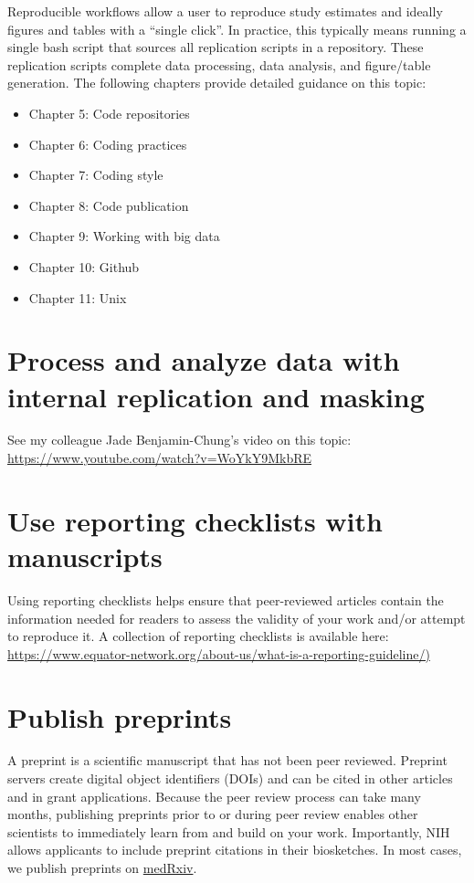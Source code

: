 \documentclass[
]{book}
\providecommand{\tightlist}{%
  \setlength{\itemsep}{0pt}\setlength{\parskip}{0pt}}
\begin{document}
Reproducible workflows allow a user to reproduce study estimates and ideally figures and tables with a ``single click''. In practice, this typically means running a single bash script that sources all replication scripts in a repository. These replication scripts complete data processing, data analysis, and figure/table generation. The following chapters provide detailed guidance on this topic:

\begin{itemize}
\tightlist
\item
  Chapter 5: Code repositories
\item
  Chapter 6: Coding practices
\item
  Chapter 7: Coding style
\item
  Chapter 8: Code publication
\item
  Chapter 9: Working with big data
\item
  Chapter 10: Github
\item
  Chapter 11: Unix
\end{itemize}

\section{Process and analyze data with internal replication and masking}\label{process-and-analyze-data-with-internal-replication-and-masking}

See my colleague Jade Benjamin-Chung's video on this topic: \url{https://www.youtube.com/watch?v=WoYkY9MkbRE}

\section{Use reporting checklists with manuscripts}\label{use-reporting-checklists-with-manuscripts}

Using reporting checklists helps ensure that peer-reviewed articles contain the information needed for readers to assess the validity of your work and/or attempt to reproduce it. A collection of reporting checklists is available here: \href{https://www.equator-network.org/about-us/what-is-a-reporting-guideline/}{https://www.equator-network.org/about-us/what-is-a-reporting-guideline/)}

\section{Publish preprints}\label{publish-preprints}

A preprint is a scientific manuscript that has not been peer reviewed. Preprint servers create digital object identifiers (DOIs) and can be cited in other articles and in grant applications. Because the peer review process can take many months, publishing preprints prior to or during peer review enables other scientists to immediately learn from and build on your work. Importantly, NIH allows applicants to include preprint citations in their biosketches. In most cases, we publish preprints on \href{https://www.medrxiv.org/}{medRxiv}.
\end{document}
